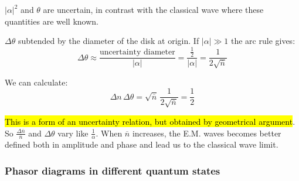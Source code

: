 $|\alpha|^2$ and $\theta$ are uncertain, in contrast with the classical wave where these quantities are well known.



$\Delta \theta$ subtended by the diameter of the disk at origin. If $|\alpha| \gg 1$ the arc rule gives:
\begin{equation}\label{eqn:13-coherent-phase-uncertainty}
\Delta\theta \approx \frac{\text{uncertainty diameter}}{|\alpha|} =\frac{\frac{1}{2}}{|\alpha|} = \frac{1}{2\sqrt{\overline{n}}}
\end{equation}

We can calculate:
\begin{equation}\label{eqn:13-coherent-uncertainty-product}
\Delta n \, \Delta \theta = \sqrt{\overline{n}}\, \frac{1}{2\sqrt{\overline{n}}} = \frac{1}{2}
\end{equation}

\hl{This is a form of an uncertainty relation, but obtained by geometrical argument}. So $\frac{\Delta \overline{n}}{\overline{n}}$ and $\Delta \theta$ vary like $\frac{1}{\alpha}$. When $\overline{n}$ increases, the E.M. waves becomes better defined both in amplitude and phase and lead us to the classical wave limit.

\subsubsection{Phasor diagrams in different quantum states}

